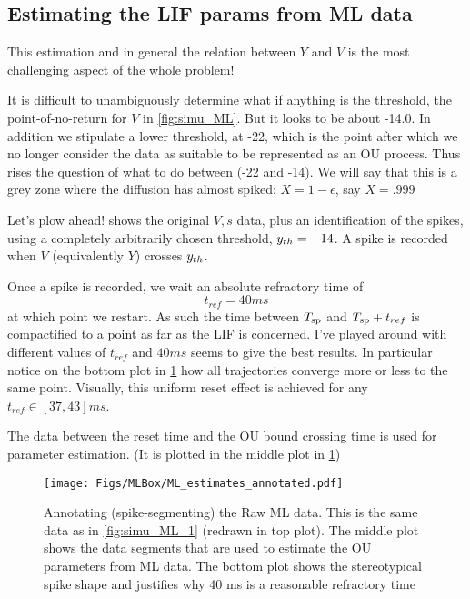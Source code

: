 \documentclass{article}
\begin{document}
\subsection{Estimating the LIF params from ML data}
\label{sec:estimaing_LIF_from_ML}
This estimation and in general the relation between $Y$ and $V$ is the most
challenging aspect of the whole problem!

It is difficult to unambiguously determine what if anything is the threshold,
the point-of-no-return for $V$ in \cref{fig:simu_ML}. But it looks to be about
-14.0. In addition we stipulate a lower threshold, at -22, which is the point
after which we no longer consider the data as suitable to be represented as an
OU process. Thus rises the question of what to do between (-22 and -14). We will
say that this is a grey zone where the diffusion has almost spiked: $X = 1-
\epsilon$, say $X = .999$

Let's plow ahead!  shows the original $V,s$ data,
plus an identification of the spikes, using a completely arbitrarily chosen
threshold, ${ y_{th} } = -14$. A spike is recorded when $V$ (equivalently $Y$) crosses
${ y_{th} }$. 

Once a spike is recorded, we wait an absolute refractory time of $$t_{ref} =
40 ms$$ at which point we restart. As such the time between ${ T_{\textrm{sp} } }$ and
${ T_{\textrm{sp} } }+t_{ref}$ is compactified to a point as far as the LIF is concerned. I've
played around with different values of $t_{ref}$ and $40 ms$ seems to give the
best results. In particular notice on the bottom plot in
\cref{fig:ML_estimates_data} how all trajectories converge more or less to the
same point. Visually, this uniform reset effect is achieved for any $t_{ref} \in
[37, 43]ms$.

The data between the reset time and the OU bound crossing time is used for
parameter estimation. (It is plotted in the middle plot in \cref{fig:ML_estimates_data})

\begin{figure}[htp]
\begin{center}
  \texttt{[image: Figs/MLBox/ML\_estimates\_annotated.pdf]} 
  \caption[labelInTOC]{Annotating (spike-segmenting) the Raw ML data. 
  This is the same data as in \cref{fig:simu_ML_1} (redrawn in top plot).
  The middle plot shows the data segments that are used to estimate the OU
  parameters from ML data.
  The bottom plot shows the stereotypical spike shape and justifies why 40 ms
  is a reasonable refractory time}
  \label{fig:ML_estimates_data} 
\end{center}
\end{figure} 
\end{document}
